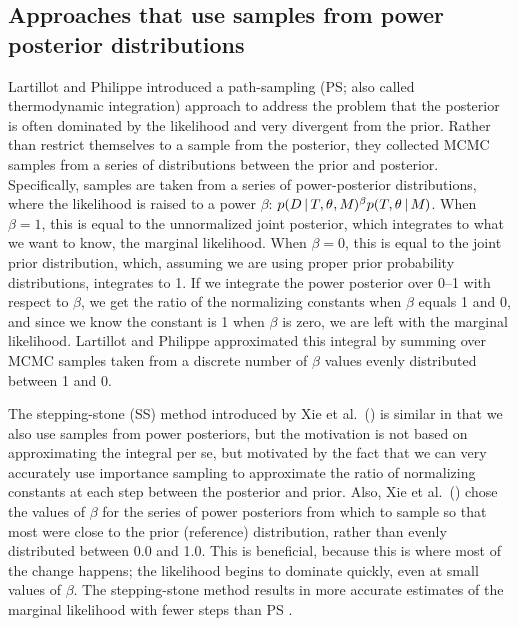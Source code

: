\subsection{Approaches that use samples from power posterior distributions}

Lartillot and Philippe \citeyear{Lartillot2006} introduced a path-sampling
(PS; also called thermodynamic integration) approach to address the problem that
the posterior is often dominated by the likelihood and very divergent from the
prior.
Rather than restrict themselves to a sample from the posterior, they collected
MCMC samples from a series of distributions between the prior and posterior.
Specifically, samples are taken from a series of power-posterior distributions,
where the likelihood is raised to a power $\beta$:
$ p(D \,|\, T, \theta_{}, M_{})^{\beta}
p(T, \theta_{} \,|\, M_{})$.
When $\beta = 1$, this is equal to the unnormalized joint posterior, which
integrates to what we want to know, the marginal likelihood.
When $\beta = 0$, this is equal to the joint prior distribution, which,
assuming we are using proper prior probability distributions, integrates to 1.
If we integrate the power posterior over 0--1 with respect to $\beta$, we get
the ratio of the normalizing constants when $\beta$ equals 1 and 0, and since
we know the constant is 1 when $\beta$ is zero, we are left with the marginal
likelihood.
Lartillot and Philippe \citeyear{Lartillot2006} approximated this integral by
summing over MCMC samples taken from a discrete number of $\beta$ values evenly
distributed between 1 and 0.

The stepping-stone (SS) method introduced by Xie et al.\ (\citeyear{Xie2011})
is similar in that we also use samples from power posteriors, but the
motivation is not based on approximating the integral per se, but motivated by
the fact that we can very accurately use importance sampling to approximate the
ratio of normalizing constants at each step between the posterior and prior.
Also, Xie et al.\ (\citeyear{Xie2011}) chose the values of $\beta$ for the
series of power posteriors from which to sample so that most were close to
the prior (reference) distribution, rather than evenly distributed between
0.0 and 1.0.
This is beneficial, because this is where most of the change happens; the
likelihood begins to dominate quickly, even at small values of $\beta$.
The stepping-stone method results in more accurate estimates of the marginal
likelihood with fewer steps than PS \citep{Xie2011}.

